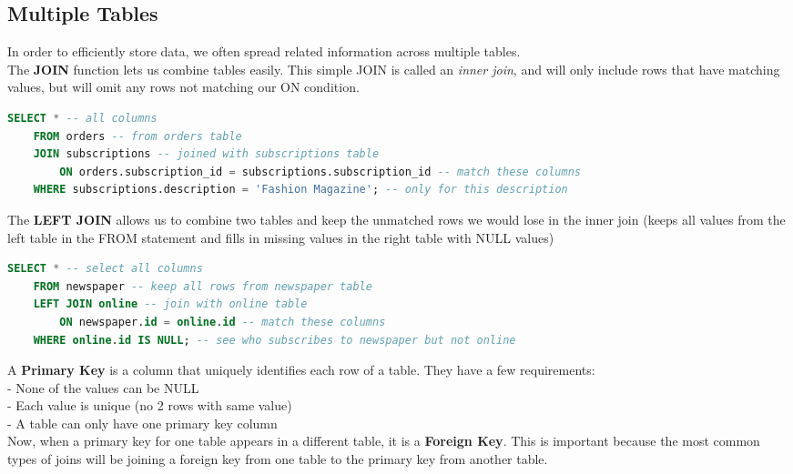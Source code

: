 \documentclass[11pt, a4paper]{article}
\begin{document}
\begin{spacing}{1.1}
	\subsection{Multiple Tables}
	In order to efficiently store data, we often spread related information across multiple tables. \vspace*{2mm}\\
	The \textbf{JOIN} function lets us combine tables easily. This simple JOIN is called an \textit{inner join}, and will only include rows that have matching values, but will omit any rows not matching our ON condition.
	\begin{lstlisting}[language=SQL]
	SELECT * -- all columns
	FROM orders -- from orders table
	JOIN subscriptions -- joined with subscriptions table
		ON orders.subscription_id = subscriptions.subscription_id -- match these columns
	WHERE subscriptions.description = 'Fashion Magazine'; -- only for this description \end{lstlisting} \vspace*{1mm}
	The \textbf{LEFT JOIN} allows us to combine two tables and keep the unmatched rows we would lose in the inner join (keeps all values from the left table in the FROM statement and fills in missing values in the right table with NULL values)
	\begin{lstlisting}[language=SQL]
	SELECT * -- select all columns
	FROM newspaper -- keep all rows from newspaper table
	LEFT JOIN online -- join with online table
		ON newspaper.id = online.id -- match these columns
	WHERE online.id IS NULL; -- see who subscribes to newspaper but not online \end{lstlisting} \vspace*{1mm}
	A \textbf{Primary Key} is a column that uniquely identifies each row of a table. They have a few requirements: \\
	\hspace*{3mm} - None of the values can be NULL \\
	\hspace*{3mm} - Each value is unique (no 2 rows with same value) \\
	\hspace*{3mm} - A table can only have one primary key column \\
	Now, when a primary key for one table appears in a different table, it is a \textbf{Foreign Key}. This is important because the most common types of joins will be joining a foreign key from one table to the primary key from another table.
	\begin{lstlisting}[language=SQL]

\end{lstlisting}
\end{spacing}
\end{document}
